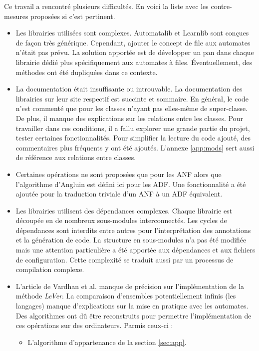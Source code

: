 Ce travail a rencontré plusieurs difficultés. En voici la liste avec les contre-mesures proposées si c'est pertinent.

\begin{itemize}
  \item Les librairies utilisées sont complexes. Automatalib et Learnlib sont conçues de façon très générique. Cependant, ajouter le concept de file aux automates n'était pas prévu. La solution apportée est de développer un pan dans chaque librairie dédié plus spécifiquement aux automates à files. Éventuellement, des méthodes ont été dupliquées dans ce contexte.
  \item La documentation était insuffisante ou introuvable. La documentation des librairies sur leur site respectif est succinte et sommaire. En général, le code n'est commenté que pour les classes n'ayant pas elles-même de super-classe. De plus, il manque des explications sur les relations entre les classes. Pour travailler dans ces conditions, il a fallu explorer une grande partie du projet, tester certaines fonctionnalités. Pour simplifier la lecture du code ajouté, des commentaires plus fréquents y ont été ajoutés. L'annexe \ref{app:mods} sert aussi de référence aux relations entre classes.
  \item Certaines opérations ne sont proposées que pour les ANF alors que l'algorithme d'Angluin est défini ici pour les ADF. Une fonctionnalité a été ajoutée pour la traduction triviale d'un ANF à un ADF équivalent.
  \item Les librairies utilisent des dépendances complexes. Chaque librairie est découpée en de nombreux sous-modules interconnectés. Les cycles de dépendances sont interdits entre autres pour l'interprétation des annotations et la génération de code. La structure en sous-modules n'a pas été modifiée mais une attention particulière a été apportée aux dépendances et aux fichiers de configuration. Cette complexité se traduit aussi par un processus de compilation complexe.
  \item L'article de Vardhan et al.\cite{Vardhan04} manque de précision sur l'implémentation de la méthode \emph{LeVer}. La comparaison d'ensembles potentiellement infinis (les langages) manque d'explications sur la mise en pratique avec les automates. Des algorithmes ont dû être reconstruits pour permettre l'implémentation de ces opérations sur des ordinateurs. Parmis ceux-ci :
  \begin{itemize}
    \item L'algorithme d'appartenance de la section \ref{sec:app}.

\end{itemize}
\end{itemize}
